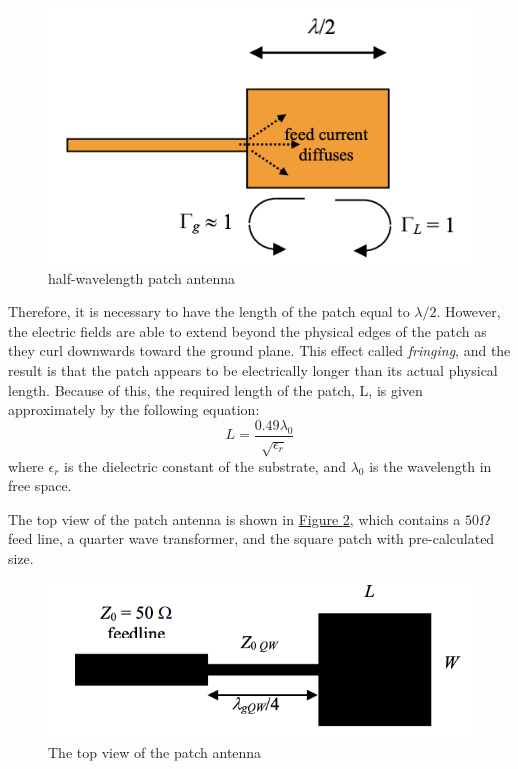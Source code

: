 \documentclass[12pt,a4paper]{report}
\begin{document}
\begin{figure}[ht]
    \centerline{\includegraphics[scale=1.3]{patch_principle}}
    \caption{half-wavelength patch antenna}
    \label{fig:patch_principle}
\end{figure}

Therefore, it is necessary to have the length of the patch equal to $\lambda / 2$. However,  the electric fields are able to extend beyond
the physical edges of the patch as they curl downwards toward the ground plane. This effect called \emph{fringing}, and the result is that the patch appears to be electrically longer than its actual
physical length. Because of this, the required length of the patch, L, is given approximately by
the following equation:
\begin{equation}
    L = \frac{0.49 \lambda_0}{\sqrt{\epsilon_r}}
    \label{equ:patch_L}
\end{equation}
where $\epsilon_r$ is the dielectric constant of the substrate, and $\lambda_0$ is the wavelength in free space.

The top view of the patch antenna is shown in \hyperref[fig:top_view]{Figure \ref*{fig:top_view}}, which contains a $50 \Omega$ feed line, a quarter wave transformer, and the square patch with pre-calculated size.

\begin{figure}[ht]
    \centerline{\includegraphics[scale=1.4]{top_view}}
    \caption{The top view of the patch antenna}
    \label{fig:top_view}
\end{figure}
\end{document}
